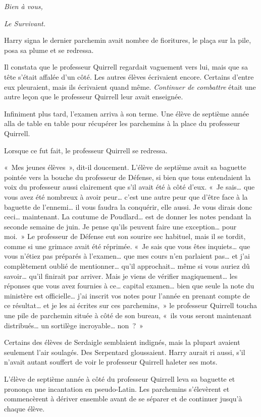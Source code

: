 \emph{Bien à vous,}

\emph{Le Survivant.}

Harry signa le dernier parchemin avait nombre de fioritures, le plaça sur la pile, posa sa plume et se redressa.

Il constata que le professeur Quirrell regardait vaguement vers lui, mais que sa tête s'était affalée d'un côté. Les autres élèves écrivaient encore. Certains d'entre eux pleuraient, mais ils écrivaient quand même. \emph{Continuer de combattre} était une autre leçon que le professeur Quirrell leur avait enseignée.

Infiniment plus tard, l'examen arriva à son terme. Une élève de septième année alla de table en table pour récupérer les parchemins à la place du professeur Quirrell.

Lorsque ce fut fait, le professeur Quirrell se redressa.

«~Mes jeunes élèves~», dit-il doucement. L'élève de septième avait sa baguette pointée vers la bouche du professeur de Défense, si bien que tous entendaient la voix du professeur aussi clairement que s'il avait été à côté d'eux. «~Je sais… que vous avez été nombreux à avoir peur… c'est une autre peur que d'être face à la baguette de l'ennemi… il vous faudra la conquérir, elle aussi. Je vous dirais donc ceci… maintenant. La coutume de Poudlard… est de donner les notes pendant la seconde semaine de juin. Je pense qu'ils peuvent faire une exception… pour moi.~» Le professeur de Défense eut son sourire sec habituel, mais il se tordit, comme si une grimace avait été réprimée. «~Je sais que vous êtes inquiets… que vous n'étiez pas préparés à l'examen… que mes cours n'en parlaient pas… et j'ai complètement oublié de mentionner… qu'il approchait… même si vous auriez dû savoir… qu'il finirait par arriver. Mais je viens de vérifier magiquement… les réponses que vous avez fournies à ce… capital examen… bien que seule la note du ministère est officielle… j'ai inscrit vos notes pour l'année en prenant compte de ce résultat… et je les ai écrites sur ces parchemins,~» le professeur Quirrell toucha une pile de parchemin située à côté de son bureau, «~ils vous seront maintenant distribués… un sortilège incroyable… non~?~»

Certains des élèves de Serdaigle semblaient indignés, mais la plupart avaient seulement l'air soulagés. Des Serpentard gloussaient. Harry aurait ri aussi, s'il n'avait autant souffert de voir le professeur Quirrell haleter ses mots.

L'élève de septième année à côté du professeur Quirrell leva sa baguette et prononça une incantation en pseudo-Latin. Les parchemins s'élevèrent et commencèrent à dériver ensemble avant de se séparer et de continuer jusqu'à chaque élève.

